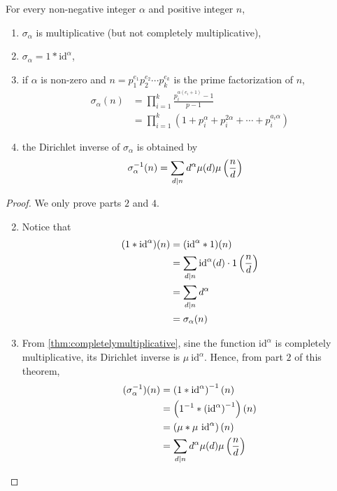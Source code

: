 \begin{theorem}
	For every non-negative integer $\alpha$ and positive integer $n$,
		\begin{enumerate}
			\item $\sigma_\alpha$ is multiplicative (but not completely multiplicative),
			\item $\sigma_\alpha = 1 \ast \text{id}^\alpha$,
			\item if $\alpha$ is non-zero and $n=p_1^{e_1}p_2^{e_2}\cdots p_k^{e_k}$ is the prime factorization of $n$,
				\begin{align*}
					\sigma_\alpha(n)
						& = \prod_{i=1}^{k} \frac{p_i^{\alpha(e_i+1)}-1}{p-1}\\
						& = \prod_{i=1}^k \left(1 + p_i^\alpha + p_i^{2\alpha} + \cdots + p_i^{a_i \alpha}\right)
				\end{align*}
			\item the Dirichlet inverse of $\sigma_\alpha$ is obtained by
				\begin{align*}
					\sigma_\alpha^{-1} (n)
						& = \sum_{d\mid n} d^\alpha\mu(d)\mu\left(\frac{n}{d}\right)
				\end{align*}
		\end{enumerate}
\end{theorem}

\begin{proof}
	We only prove parts $2$ and $4$.
		\begin{enumerate} \setcounter{enumi}{1}
			\item Notice that
				\begin{align*}
					(1 \ast \text{id}^\alpha)(n)
						&= ( \text{id}^\alpha\ast 1)(n)\\
						& = \sum_{d\mid n} \text{id}^\alpha (d) \cdot 1\left(\frac{n}{d}\right)\\
						&= \sum_{d\mid n} d^\alpha \\
						&= \sigma_\alpha (n)
				\end{align*}
			\setcounter{enumi}{3}
			\item From \autoref{thm:completelymultiplicative}, sine the function $\text{id}^\alpha$ is completely multiplicative, its Dirichlet inverse is $\mu \ \text{id}^\alpha$. Hence, from part $2$ of this theorem,
				\begin{align*}
					(\sigma_\alpha^{-1})(n)
								&= \left(1 \ast \text{id}^\alpha\right)^{-1}(n)\\
								&= \left(1^{-1} \ast  \left(\text{id}^\alpha\right)^{-1}\right)(n)\\
				    &= \left(\mu \ast \mu \ \text{id}^\alpha\right)(n)\\
				    &= \sum_{d\mid n} d^\alpha \mu(d)\mu\parenthesis{\frac{n}{d}}
				\end{align*}
		\end{enumerate}
\end{proof}



